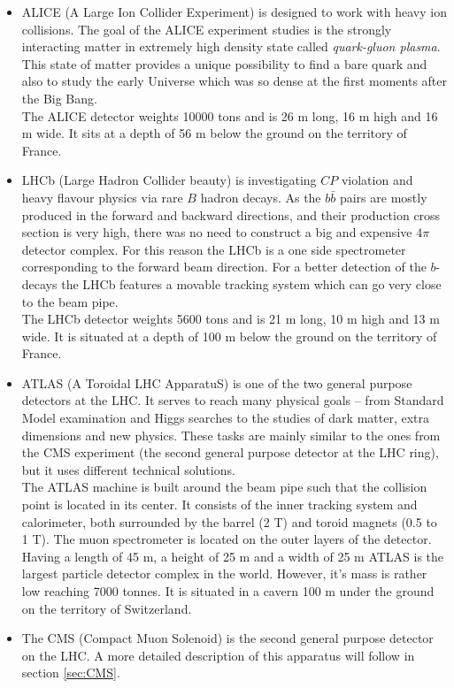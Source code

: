 \begin{itemize}
 \item ALICE (A Large Ion Collider Experiment)\cite{ALICEtdr} is designed to
 work with heavy ion collisions. The goal of the ALICE experiment studies is
 the strongly interacting matter in extremely high density state called \textit{quark-gluon plasma}. This 
 state of matter provides a unique possibility to find a bare quark and also to study the early
 Universe which was so dense at the first moments after the Big Bang.
 \\
 The ALICE detector weights 10000 tons and is 26 m long, 16 m high and 16 m wide. It sits at a depth of
 56 m below the ground on the territory of France.
 
 \item LHCb (Large Hadron Collider beauty)\cite{LHCb} is investigating $CP$ violation and heavy flavour physics via
 rare $B$ hadron decays. As the $b\bar{b}$ pairs are mostly produced in the forward and backward directions, 
 and their production cross section is very high, there was no need to construct a big and expensive $4\pi$ detector 
 complex. For this reason the LHCb is a one side spectrometer corresponding to the forward beam direction.
 For a better detection of the $b$-decays the LHCb features a movable tracking system which can go very close
 to the beam pipe.
 \\
 The LHCb detector weights 5600 tons and is 21 m long, 10 m high and 13 m wide. It is situated at a depth of 100 m 
 below the ground on the territory of France.
 
 \item ATLAS (A Toroidal LHC ApparatuS)\cite{ATLAS} is one of the two general purpose detectors at the LHC. It serves to reach many physical
 goals -- from Standard Model examination and Higgs searches to the studies of dark matter, extra dimensions and new physics.
 These tasks are mainly similar to the ones from the CMS experiment (the second general purpose detector at the LHC ring), but
 it uses different technical solutions.
 \\
 The ATLAS machine is built around the beam pipe such that the collision point is located in its center. It consists of the 
 inner tracking system and calorimeter, both surrounded by the barrel (2 T) and toroid magnets (0.5 to 1 T). The muon spectrometer
 is located on the outer layers of the detector.
 \\
 Having a length of 45 m, a height of 25 m and a width of 25 m ATLAS is the largest particle detector complex in the world. However, it's mass 
 is rather low reaching 7000 tonnes. It is situated in a cavern 100 m under the ground on the territory of Switzerland.
 
 \item The CMS (Compact Muon Solenoid) is the second general purpose detector on the LHC. A more detailed description of this apparatus will follow in
 section \ref{sec:CMS}.
 
\end{itemize}


